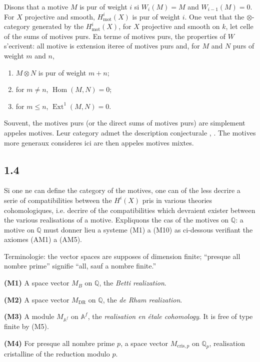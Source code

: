 \documentclass[12pt,a4paper]{article}
\theoremstyle{plain}
\theoremstyle{definition}
\theoremstyle{remark}
\DeclareMathOperator{\Hom}{Hom}
\DeclareMathOperator{\Ext}{Ext}
\newcommand{\mot}{\mathrm{mot}}
\providecommand{\Hom}{\operatorname{Hom}}
\providecommand{\Ext}{\operatorname{Ext}}
\providecommand{\mot}{\mathrm{mot}}
\providecommand{\DR}{\mathrm{DR}}
\providecommand{\cris}{\mathrm{cris}}
\begin{document}
Disons that a motive $M$ is pur of weight $i$ si $W_i(M) = M$ and $W_{i-1}(M) = 0$. For
$X$ projective and smooth, $H^i_\mot(X)$ is pur of weight $i$. One veut that the
$\otimes$-category generated by the $H^i_\mot(X)$, for $X$ projective and smooth on
$k$, let celle of the sums of motives purs. En terme of motives purs, the properties of
$W$ s'ecrivent: all motive is extension iteree of motives purs and, for $M$ and $N$
purs of weight $m$ and $n$,
\begin{enumerate}[label=(\alph*)]
\item $M \otimes N$ is pur of weight $m + n$;
\item for $m \neq n$, $\Hom(M,N) = 0$;
\item for $m \leq n$, $\Ext^1(M,N) = 0$.
\end{enumerate}

Souvent, the motives purs (or the direct sums of motives purs) are simplement
appeles motives. Leur category admet the description conjecturale \cite{Kl}, \cite{Man}.
The motives more generaux consideres ici are then appeles motives mixtes.

\subsection*{1.4}

Si one ne can define the category of the motives, one can of the less decrire a serie
of compatibilities between the $H^i(X)$ pris in various theories cohomologiques, i.e.
decrire of the compatibilities which devraient exister between the various realisations of a
motive. Expliquons the cas of the motives on $\mathbb{Q}$: a motive on $\mathbb{Q}$ must donner
lieu a systeme (M1) a (M10) as ci-dessous verifiant the axiomes (AM1) a (AM5).

Terminologie: the vector spaces are supposes of dimension finite; ``presque all
nombre prime'' signifie ``all, sauf a nombre finite.''

\textbf{(M1)} A space vector $M_B$ on $\mathbb{Q}$, the \emph{Betti realization}.

\textbf{(M2)} A space vector $M_{\DR}$ on $\mathbb{Q}$, the \emph{de Rham realization}.

\textbf{(M3)} A module $M_{\mathbb{A}^f}$ on $\mathbb{A}^f$, the \emph{realisation en
étale cohomology}. It is free of type finite by (M5).

\textbf{(M4)} For presque all nombre prime $p$, a space vector $M_{\cris,p}$ on
$\mathbb{Q}_p$, realisation cristalline of the reduction modulo $p$.
\end{document}

